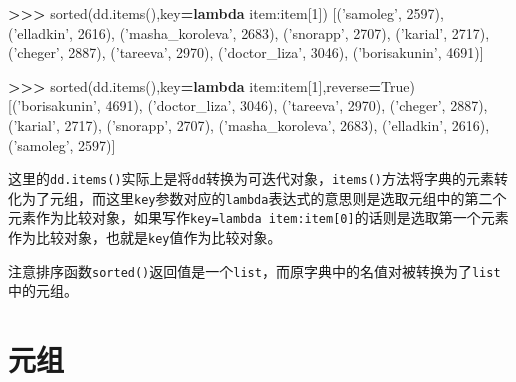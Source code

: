\documentclass[]{ctexbook}
\newenvironment{Shaded}{\begin{snugshade}}{\end{snugshade}}
\newcommand{\BuiltInTok}[1]{#1}
\newcommand{\DecValTok}[1]{\textcolor[rgb]{0.00,0.00,0.81}{#1}}
\newcommand{\KeywordTok}[1]{\textcolor[rgb]{0.13,0.29,0.53}{\textbf{#1}}}
\newcommand{\NormalTok}[1]{#1}
\newcommand{\OperatorTok}[1]{\textcolor[rgb]{0.81,0.36,0.00}{\textbf{#1}}}
\newcommand{\StringTok}[1]{\textcolor[rgb]{0.31,0.60,0.02}{#1}}
\newcommand{\VariableTok}[1]{\textcolor[rgb]{0.00,0.00,0.00}{#1}}
\begin{document}
\begin{Shaded}
\begin{Highlighting}[]
\OperatorTok{>>>} \BuiltInTok{sorted}\NormalTok{(dd.items(),key}\OperatorTok{=}\KeywordTok{lambda}\NormalTok{ item:item[}\DecValTok{1}\NormalTok{])}
\NormalTok{[(}\StringTok{'samoleg'}\NormalTok{, }\DecValTok{2597}\NormalTok{), (}\StringTok{'elladkin'}\NormalTok{, }\DecValTok{2616}\NormalTok{), (}\StringTok{'masha_koroleva'}\NormalTok{, }\DecValTok{2683}\NormalTok{), (}\StringTok{'snorapp'}\NormalTok{, }\DecValTok{2707}\NormalTok{), (}\StringTok{'karial'}\NormalTok{, }\DecValTok{2717}\NormalTok{), (}\StringTok{'cheger'}\NormalTok{, }\DecValTok{2887}\NormalTok{), (}\StringTok{'tareeva'}\NormalTok{, }\DecValTok{2970}\NormalTok{), (}\StringTok{'doctor_liza'}\NormalTok{, }\DecValTok{3046}\NormalTok{), (}\StringTok{'borisakunin'}\NormalTok{, }\DecValTok{4691}\NormalTok{)]}

\OperatorTok{>>>} \BuiltInTok{sorted}\NormalTok{(dd.items(),key}\OperatorTok{=}\KeywordTok{lambda}\NormalTok{ item:item[}\DecValTok{1}\NormalTok{],reverse}\OperatorTok{=}\VariableTok{True}\NormalTok{)}
\NormalTok{[(}\StringTok{'borisakunin'}\NormalTok{, }\DecValTok{4691}\NormalTok{), (}\StringTok{'doctor_liza'}\NormalTok{, }\DecValTok{3046}\NormalTok{), (}\StringTok{'tareeva'}\NormalTok{, }\DecValTok{2970}\NormalTok{), (}\StringTok{'cheger'}\NormalTok{, }\DecValTok{2887}\NormalTok{), (}\StringTok{'karial'}\NormalTok{, }\DecValTok{2717}\NormalTok{), (}\StringTok{'snorapp'}\NormalTok{, }\DecValTok{2707}\NormalTok{), (}\StringTok{'masha_koroleva'}\NormalTok{, }\DecValTok{2683}\NormalTok{), (}\StringTok{'elladkin'}\NormalTok{, }\DecValTok{2616}\NormalTok{), (}\StringTok{'samoleg'}\NormalTok{, }\DecValTok{2597}\NormalTok{)]}
\end{Highlighting}
\end{Shaded}

这里的\texttt{dd.items()}实际上是将\texttt{dd}转换为可迭代对象，\texttt{items()}方法将字典的元素转化为了元组，而这里\texttt{key}参数对应的\texttt{lambda}表达式的意思则是选取元组中的第二个元素作为比较对象，如果写作\texttt{key=lambda\ item:item{[}0{]}}的话则是选取第一个元素作为比较对象，也就是\texttt{key}值作为比较对象。

注意排序函数\texttt{sorted()}返回值是一个\texttt{list}，而原字典中的名值对被转换为了\texttt{list}中的元组。

\hypertarget{ux5143ux7ec4}{%
\section{元组}\label{ux5143ux7ec4}}
\end{document}

